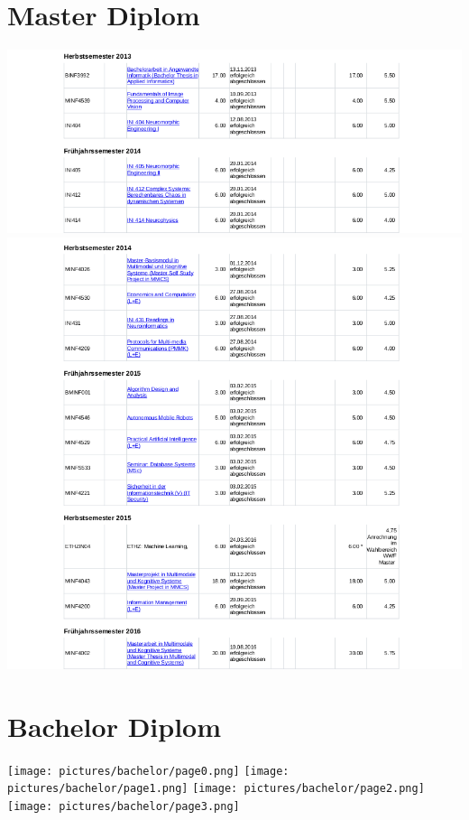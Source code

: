 \documentclass[11pt,a4paper,sans]{moderncv} %
\begin{document}
\section{Master Diplom}
\includegraphics[width=\textwidth]{pictures/master/module1.png}
\includegraphics[width=\textwidth]{pictures/master/module2.png}

\enlargethispage{12pt}
\newpage
\section{Bachelor Diplom}
\texttt{[image: pictures/bachelor/page0.png]}
\texttt{[image: pictures/bachelor/page1.png]}
\texttt{[image: pictures/bachelor/page2.png]}
\texttt{[image: pictures/bachelor/page3.png]}

\restoregeometry
\end{document}
